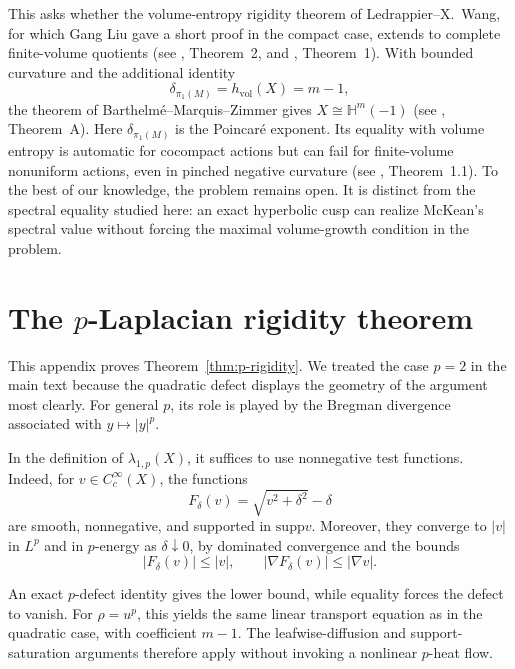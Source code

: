 \documentclass[12pt]{amsart}
\theoremstyle{definition}
\numberwithin{equation}{section}
\newcommand{\supp}{\mathrm{supp}}
\begin{document}
This asks whether the volume-entropy rigidity theorem of
Ledrappier--X.~Wang, for which Gang Liu gave a short proof in the compact
case, extends to complete finite-volume quotients (see
\cite{LedrappierWang2010}, Theorem~2, and
\cite{Liu2011}, Theorem~1).  With bounded curvature and the additional
identity
\[
  \delta_{\pi_1(M)}=h_{\mathrm{vol}}(X)=m-1,
\]
the theorem of Barthelm\'e--Marquis--Zimmer gives
\(X\cong\mathbb H^m(-1)\) (see
\cite{BarthelmeMarquisZimmer2018}, Theorem~A).  Here
\(\delta_{\pi_1(M)}\) is the Poincar\'e exponent.  Its equality with
volume entropy is automatic for cocompact actions but can fail for
finite-volume nonuniform actions, even in pinched negative curvature
(see \cite{DalboPeignePicaudSambusetti2009}, Theorem~1.1).  To the best of our
knowledge, the problem remains open.  It is distinct from the spectral
equality studied here: an exact hyperbolic cusp can realize McKean's
spectral value without forcing the maximal volume-growth condition in the
problem.




\appendix

\section{The \texorpdfstring{\(p\)}{p}-Laplacian rigidity theorem}
\label{app:p-rigidity}

This appendix proves Theorem~\ref{thm:p-rigidity}.  We treated the case
\(p=2\) in the main text because the quadratic defect displays the
geometry of the argument most clearly.  For general \(p\), its role is
played by the Bregman divergence associated with \(y\mapsto |y|^p\).

In the definition of \(\lambda_{1,p}(X)\), it suffices to use
nonnegative test functions.  Indeed, for \(v\in C_c^\infty(X)\), the
functions
\[
  F_\delta(v)=\sqrt{v^2+\delta^2}-\delta
\]
are smooth, nonnegative, and supported in \(\supp v\).  Moreover, they
converge to \(|v|\) in \(L^p\) and in \(p\)-energy as
\(\delta\downarrow0\), by dominated convergence and the bounds
\[
  |F_\delta(v)|\leq |v|,
  \qquad |\nabla F_\delta(v)|\leq |\nabla v|.
\]

An exact \(p\)-defect identity gives the lower bound, while equality
forces the defect to vanish.  For \(\rho=u^p\), this yields the same
linear transport equation as in the quadratic case, with coefficient
\(m-1\).  The leafwise-diffusion and support-saturation arguments
therefore apply without invoking a nonlinear \(p\)-heat flow.
\end{document}
